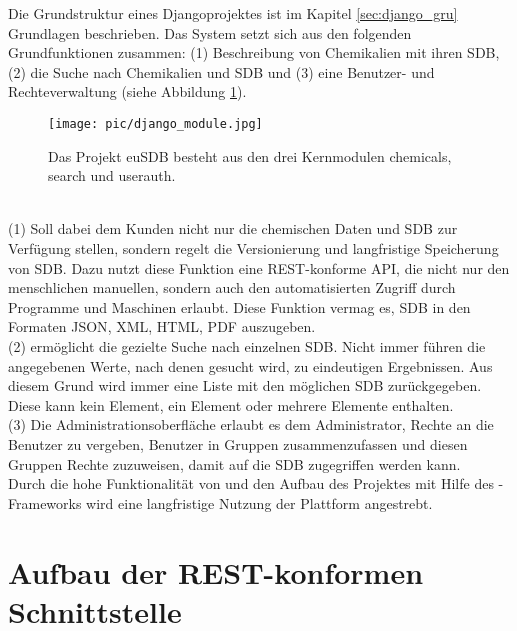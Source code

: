Die Grundstruktur eines Djangoprojektes ist im Kapitel \ref{sec:django_gru}
Grundlagen beschrieben. Das System setzt sich aus den folgenden
Grundfunktionen zusammen: (1) Beschreibung von Chemikalien mit ihren \ac{SDB},
(2) die Suche nach Chemikalien und \ac{SDB} und (3) eine Benutzer- und
Rechteverwaltung (siehe Abbildung \ref{fig:django_module}).
\begin{figure}[h]
  \centering
    \texttt{[image: pic/django\_module.jpg]}
      \caption[Aufbau des euSDB-Django-Projektes]{Das Projekt euSDB besteht aus
      den drei Kernmodulen chemicals, search und userauth.}
      \label{fig:django_module}
\end{figure}
\\
(1) Soll dabei dem Kunden nicht nur die chemischen Daten und \ac{SDB} zur
Verfügung stellen, sondern regelt die Versionierung und langfristige Speicherung
von \ac{SDB}. Dazu nutzt diese Funktion eine \ac{REST}-konforme \ac{API}, die
nicht nur den menschlichen manuellen, sondern auch den automatisierten Zugriff
durch Programme und Maschinen erlaubt. Diese Funktion vermag es, \ac{SDB} in den
Formaten \ac{JSON}, \ac{XML}, \ac{HTML}, \ac{PDF} auszugeben.
\\
(2)  ermöglicht die gezielte Suche nach einzelnen \ac{SDB}.
Nicht immer führen die angegebenen Werte, nach denen gesucht wird, zu eindeutigen Ergebnissen. Aus
diesem Grund wird immer eine Liste mit den möglichen \ac{SDB} zurückgegeben.
Diese kann kein Element, ein Element oder mehrere Elemente enthalten.
\\
(3) Die Administrationsoberfläche erlaubt es dem Administrator, Rechte an die
Benutzer zu vergeben, Benutzer in Gruppen zusammenzufassen und diesen Gruppen
Rechte zuzuweisen, damit auf die \ac{SDB} zugegriffen werden kann.
\\
Durch die hohe Funktionalität von  und den Aufbau des Projektes mit
Hilfe des -Frameworks wird eine langfristige Nutzung der Plattform
angestrebt.

\section{Aufbau der REST-konformen Schnittstelle}
\label{aufbau_rest_schnittstelle_kon}

